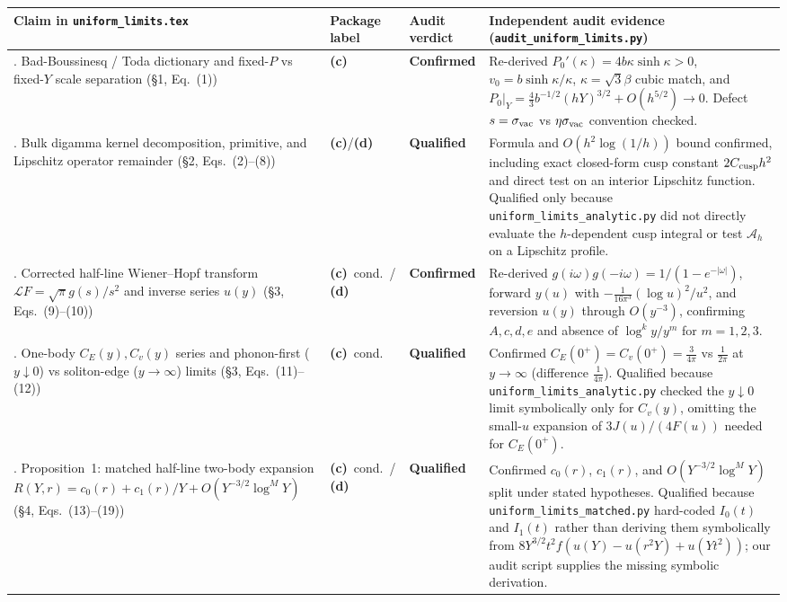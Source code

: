 \documentclass[11pt,a4paper]{article}
\newcommand{\C}{\textbf{(c)}}
\newcommand{\D}{\textbf{(d)}}
\newcommand{\scr}[1]{\texttt{#1}}
\begin{document}
\begin{center}
\small
\begin{longtable}{>{\raggedright\arraybackslash}p{3.1cm} >{\raggedright\arraybackslash}p{1.5cm} >{\raggedright\arraybackslash}p{1.9cm} >{\raggedright\arraybackslash}p{7.6cm}}
\toprule
Claim in \scr{uniform\_limits.tex} & Package label & Audit verdict & Independent audit evidence (\scr{audit\_uniform\_limits.py}) \\
\midrule
\endhead
1. Bad-Boussinesq / Toda dictionary and fixed-$P$ vs fixed-$Y$ scale separation (\S1, Eq.~(1)) & \C & \textbf{Confirmed} & Re-derived $P_0'(\kappa)=4b\kappa\sinh\kappa>0$, $v_0=b\sinh\kappa/\kappa$, $\kappa=\sqrt{3}\beta$ cubic match, and $P_0|_{Y}=\frac43 b^{-1/2}(hY)^{3/2}+O(h^{5/2})\to 0$. Defect $s=\sigma_{\rm vac}$ vs $\eta\sigma_{\rm vac}$ convention checked. \\
\addlinespace
2. Bulk digamma kernel decomposition, primitive, and Lipschitz operator remainder (\S2, Eqs.~(2)--(8)) & \C/\D & \textbf{Qualified} & Formula and $O(h^2\log(1/h))$ bound confirmed, including exact closed-form cusp constant $2C_{\rm cusp}h^2$ and direct test on an interior Lipschitz function. Qualified only because \scr{uniform\_limits\_analytic.py} did not directly evaluate the $h$-dependent cusp integral or test $\mathcal A_h$ on a Lipschitz profile. \\
\addlinespace
3. Corrected half-line Wiener--Hopf transform $\mathcal L F=\sqrt{\pi}g(s)/s^2$ and inverse series $u(y)$ (\S3, Eqs.~(9)--(10)) & \C\ cond.\ / \D & \textbf{Confirmed} & Re-derived $g(i\omega)g(-i\omega)=1/(1-e^{-|\omega|})$, forward $y(u)$ with $-\frac{1}{16\pi^3}(\log u)^2/u^2$, and reversion $u(y)$ through $O(y^{-3})$, confirming $A,c,d,e$ and absence of $\log^k y/y^m$ for $m=1,2,3$. \\
\addlinespace
4. One-body $C_E(y),C_v(y)$ series and phonon-first ($y\downarrow 0$) vs soliton-edge ($y\to\infty$) limits (\S3, Eqs.~(11)--(12)) & \C\ cond. & \textbf{Qualified} & Confirmed $C_E(0^+)=C_v(0^+)=\frac{3}{4\pi}$ vs $\frac{1}{2\pi}$ at $y\to\infty$ (difference $\frac{1}{4\pi}$). Qualified because \scr{uniform\_limits\_analytic.py} checked the $y\downarrow 0$ limit symbolically only for $C_v(y)$, omitting the small-$u$ expansion of $3J(u)/(4F(u))$ needed for $C_E(0^+)$. \\
\addlinespace
5. Proposition~1: matched half-line two-body expansion $R(Y,r)=c_0(r)+c_1(r)/Y+O(Y^{-3/2}\log^M Y)$ (\S4, Eqs.~(13)--(19)) & \C\ cond.\ / \D & \textbf{Qualified} & Confirmed $c_0(r)$, $c_1(r)$, and $O(Y^{-3/2}\log^M Y)$ split under stated hypotheses. Qualified because \scr{uniform\_limits\_matched.py} hard-coded $I_0(t)$ and $I_1(t)$ rather than deriving them symbolically from $8Y^{3/2}t^2 f(u(Y)-u(r^2Y)+u(Yt^2))$; our audit script supplies the missing symbolic derivation. \\

\end{longtable}
\end{center}
\end{document}
